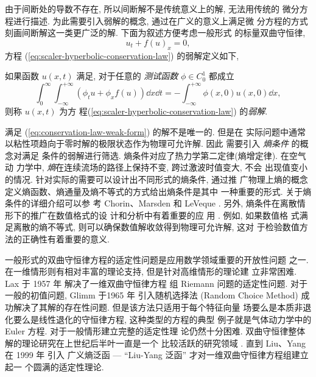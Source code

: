 由于间断处的导数不存在, 所以间断解不是传统意义上的解, 无法用传统的
微分方程进行描述. 为此需要引入弱解的概念, 通过在广义的意义上满足微
分方程的方式刻画间断解这一类更广泛的解. 下面为叙述方便考虑一般形式
的标量双曲守恒律,
\begin{equation}
  \label{eq:scaler-hyperbolic-conservation-law}
  u_{t} + f(u)_{x} = 0,
\end{equation}
方程 (\ref{eq:scaler-hyperbolic-conservation-law}) 的弱解定义如下,
\begin{definition}
  如果函数 $u(x,t)$ 满足, 对于任意的 {\it 测试函数} $\phi \in
  C_{0}^{1}$ 都成立
  \begin{equation}
    \label{eq:conservation-law-weak-form}
    \int_{0}^{\infty} \int_{-\infty}^{+\infty} \left( \phi_{t}u +
      \phi_{x}f(u)\right) \dd x \dd t = - \int_{-\infty}^{+\infty}
    \phi (x,0) u(x,0) \dd x,
  \end{equation}
  则称 $u(x,t)$ 为方
  程(\ref{eq:scaler-hyperbolic-conservation-law}) 的{\it 弱解}.
\end{definition}
满足 (\ref{eq:conservation-law-weak-form}) 的解不是唯一的. 但是在
实际问题中通常以粘性项趋向于零时解的极限状态作为物理可允许解. 因此
需要引入 {\it 熵条件} 的概念对满足
条件的弱解进行筛选. 熵条件对应了热力学第二定律(熵增定律). 在空气动
力学中, {\it 熵}在连续流场的路径上保持不变, 跨过激波时值变大, 不会
出现值变小的情况. 针对实际的需要可以设计出不同形式的熵条件, 通过推
广物理上熵的概念定义熵函数、熵通量及熵不等式的方式给出熵条件是其中
一种重要的形式. 关于熵条件的详细介绍可以参
考 Chorin、Marsden\cite{Chorin1993} 和 LeVeque
\cite{LeVeque1992a}. 另外, 熵条件在离散情形下的推广在数值格式的设
计和分析中有着重要的应
用 \cite{Majda1979,Osher1984,Jiang1994,Hou2006}. 例如, 如果数值格
式满足离散的熵不等式, 则可以确保数值解收敛得到物理可允许解, 这对
于检验数值方法的正确性有着重要的意义.

一般形式的双曲守恒律方程的适定性问题是应用数学领域重要的开放性问题
之一.  在一维情形则有相对丰富的理论支持, 但是针对高维情形的理论建
立非常困难. Lax 于 1957 年 \cite{Lax1957} 解决了一维双曲守恒律方程
组 Riemann 问题的适定性问题. 对于一般的初值问题,
Glimm 于1965 年 \cite{Glimm1965} 引入随机选择法 (Random Choice
Method) 成功解决了其解的存在性问题. 但是该方法只适用于每个特征向量
场要么是本质非退化要么是线性退化的守恒律方程, 这种类型的方程的典型
例子就是气体动力学中的 Euler 方程. 对于一般情形建立完整的适定性理
论仍然十分困难. 双曲守恒律整体解的理论研究在上世纪后半叶一直是一个
比较活跃的研究领域 . 直到 Liu、Yang 在 1999 年\cite{Liu1999} 引入
广义熵泛函 --- ``Liu-Yang 泛函'' 才对一维双曲守恒律方程组建立起一
个圆满的适定性理论.

